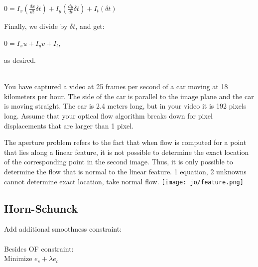 $0 = I_x(\frac{dx}{dt}\delta t) + I_y(\frac{dy}{dt}\delta t) + I_t(\delta t)$

Finally, we divide by $\delta t$, and get:

$0 = I_xu + I_yv + I_t$,

as desired.

\\
You have captured a video at 25 frames per second of a car moving at 18 kilometers
per hour. The side of the car is parallel to the image plane and the car is moving
straight. The car is 2.4 meters long, but in your video it is 192 pixels long. Assume
that your optical flow algorithm breaks down for pixel displacements that are larger
than 1 pixel.\\
 
 The aperture problem refers to the fact that when flow is computed for a point that lies along a linear feature, it is not possible to determine the exact location of the corresponding point in the second image. Thus, it is only possible to determine the flow that is normal to the linear feature. 1 equation, 2 unknowns cannot determine exact location, take normal flow. \texttt{[image: jo/feature.png]}\\
\subsection*{Horn-Schunck}
Add additional smoothness constraint: \\
\\
Besides OF constraint: \\
 Minimize $e_s + \lambda e_c$
